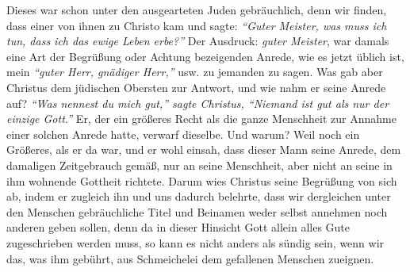 Dieses war schon unter den ausgearteten Juden
gebräuchlich, denn wir finden, dass
einer von ihnen zu Christo kam und sagte:
\textit{"`Guter Meister, was muss ich tun,
dass ich das ewige Leben erbe?"'}
Der Ausdruck: \textit{guter
Meister}, war damals eine Art der Begrüßung oder Achtung bezeigenden Anrede, wie
es jetzt üblich ist, mein \textit{"`guter Herr, gnädiger Herr,"'} usw. zu
jemanden zu
sagen. Was gab aber Christus dem jüdischen Obersten zur Antwort, und wie nahm er
seine Anrede auf?
\textit{"`Was nennest du mich gut,"' sagte Christus, "`Niemand ist gut
als nur der einzige Gott."'} Er, der ein größeres Recht
als
die ganze Menschheit zur Annahme einer solchen Anrede hatte, verwarf dieselbe.
Und warum? Weil noch ein Größeres, als er da war, und er wohl einsah, dass
dieser Mann seine Anrede, dem damaligen Zeitgebrauch gemäß, nur an seine
Menschheit, aber nicht an seine in ihm wohnende Gottheit richtete.
Darum wies
Christus seine Begrüßung von sich ab, indem er zugleich ihn und uns dadurch
belehrte, dass wir dergleichen unter den Menschen gebräuchliche Titel und
Beinamen weder selbst annehmen noch anderen geben sollen, denn da in dieser
Hinsicht Gott allein alles Gute zugeschrieben werden muss, so kann es nicht
anders als sündig sein, wenn wir das, was ihm gebührt, aus Schmeichelei dem
gefallenen Menschen zueignen.

\medskip

